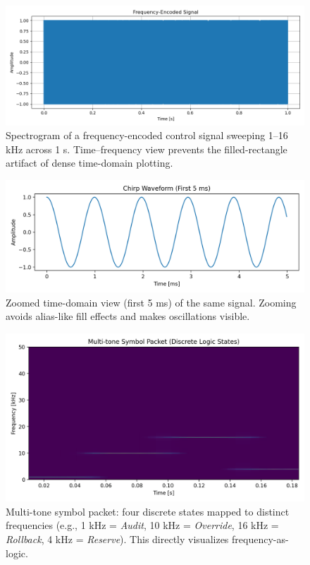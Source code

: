 \documentclass[11pt]{article}
\begin{document}
\begin{figure}[t]
  \centering
  \includegraphics[width=\linewidth]{frequency_encoded_signal.png}
  \caption{Spectrogram of a frequency-encoded control signal sweeping 1–16 kHz across 1 s. Time–frequency view prevents the filled-rectangle artifact of dense time-domain plotting.}
  \label{fig:chirp-spectrogram}
\end{figure}

\begin{figure}[t]
  \centering
  \includegraphics[width=\linewidth]{waveform_zoom.png}
  \caption{Zoomed time-domain view (first 5 ms) of the same signal. Zooming avoids alias-like fill effects and makes oscillations visible.}
  \label{fig:chirp-zoom}
\end{figure}

\begin{figure}[t]
  \centering
  \includegraphics[width=\linewidth]{multitone_packet.png}
  \caption{Multi-tone symbol packet: four discrete states mapped to distinct frequencies (e.g., 1 kHz = \emph{Audit}, 10 kHz = \emph{Override}, 16 kHz = \emph{Rollback}, 4 kHz = \emph{Reserve}). This directly visualizes frequency-as-logic.}
  \label{fig:multitone-packet}
\end{figure}
\end{document}
